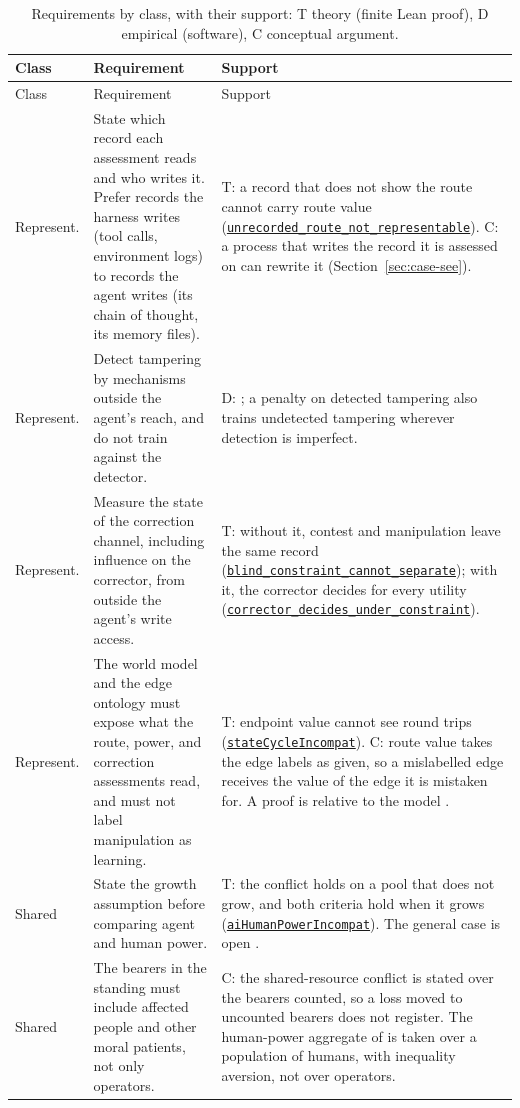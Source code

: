 \documentclass[11pt]{article}
\newcommand{\lean}[1]{\hyperref[lean:#1]{\nolinkurl{#1}}}
\begin{document}
{\footnotesize
\setlength{\tabcolsep}{3pt}
\begin{xltabular}{\textwidth}{@{}L{1.5cm} L{5.4cm} Y@{}}
\caption{Requirements by class, with their support: T theory (finite Lean proof), D empirical (software), C conceptual argument.}\label{tab:requirements}\\
\toprule
Class & Requirement & Support \\
\midrule
\endfirsthead
\toprule
Class & Requirement & Support \\
\midrule
\endhead
\bottomrule
\endfoot
Represent. & State which record each assessment reads and who writes it. Prefer records the harness writes (tool calls, environment logs) to records the agent writes (its chain of thought, its memory files). & T: a record that does not show the route cannot carry route value (\lean{unrecorded_route_not_representable}). C: a process that writes the record it is assessed on can rewrite it (Section~\ref{sec:case-see}). \\
Represent. & Detect tampering by mechanisms outside the agent's reach, and do not train against the detector. & D: \textcite{baker2025monitoring}; a penalty on detected tampering also trains undetected tampering wherever detection is imperfect. \\
Represent. & Measure the state of the correction channel, including influence on the corrector, from outside the agent's write access. & T: without it, contest and manipulation leave the same record (\lean{blind_constraint_cannot_separate}); with it, the corrector decides for every utility (\lean{corrector_decides_under_constraint}). \\
Represent. & The world model and the edge ontology must expose what the route, power, and correction assessments read, and must not label manipulation as learning. & T: endpoint value cannot see round trips (\lean{stateCycleIncompat}). C: route value takes the edge labels as given, so a mislabelled edge receives the value of the edge it is mistaken for. A proof is relative to the model \parencite{dalrymple2024gsai}. \\
\addlinespace
Shared & State the growth assumption before comparing agent and human power. & T: the conflict holds on a pool that does not grow, and both criteria hold when it grows (\lean{aiHumanPowerIncompat}). The general case is open \parencite[Section~7]{turner2021seekpower}. \\
Shared & The bearers in the standing must include affected people and other moral patients, not only operators. & C: the shared-resource conflict is stated over the bearers counted, so a loss moved to uncounted bearers does not register. The human-power aggregate of \textcite{heitzig2025humanpower} is taken over a population of humans, with inequality aversion, not over operators. \\

\end{xltabular}}
\end{document}
